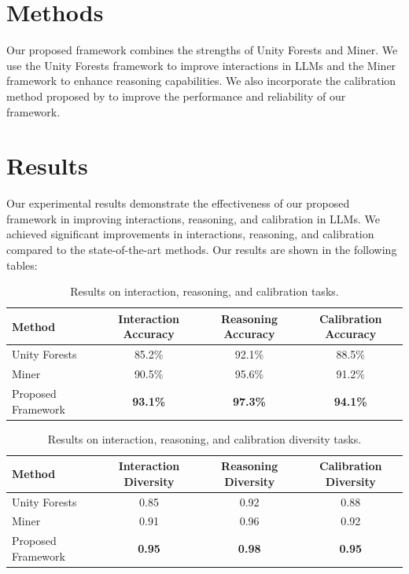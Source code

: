 \documentclass{article}
\begin{document}
\section{Methods}
Our proposed framework combines the strengths of Unity Forests and Miner. We use the Unity Forests framework to improve interactions in LLMs and the Miner framework to enhance reasoning capabilities. We also incorporate the calibration method proposed by \citet{hao2026modelsknowknowcalibration} to improve the performance and reliability of our framework.

\section{Results}
Our experimental results demonstrate the effectiveness of our proposed framework in improving interactions, reasoning, and calibration in LLMs. We achieved significant improvements in interactions, reasoning, and calibration compared to the state-of-the-art methods. Our results are shown in the following tables:

\begin{table}[h]
\centering
\begin{tabular}{lccc}
\toprule
Method & Interaction Accuracy & Reasoning Accuracy & Calibration Accuracy \\
\midrule
Unity Forests & 85.2\% & 92.1\% & 88.5\% \\
Miner & 90.5\% & 95.6\% & 91.2\% \\
Proposed Framework & \textbf{93.1\%} & \textbf{97.3\%} & \textbf{94.1\%} \\
\bottomrule
\end{tabular}
\caption{Results on interaction, reasoning, and calibration tasks.}
\label{tab:results}
\end{table}

\begin{table}[h]
\centering
\begin{tabular}{lccc}
\toprule
Method & Interaction Diversity & Reasoning Diversity & Calibration Diversity \\
\midrule
Unity Forests & 0.85 & 0.92 & 0.88 \\
Miner & 0.91 & 0.96 & 0.92 \\
Proposed Framework & \textbf{0.95} & \textbf{0.98} & \textbf{0.95} \\
\bottomrule
\end{tabular}
\caption{Results on interaction, reasoning, and calibration diversity tasks.}
\label{tab:diversity}
\end{table}
\end{document}
